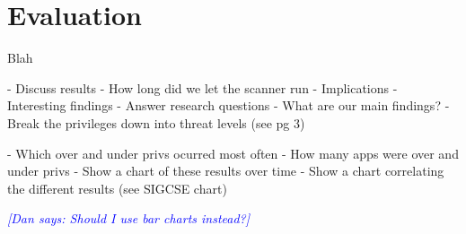 \documentclass{sig-alternate}
\newcommand{\dan}[1]{\textcolor{blue}{{\it [Dan says: #1]}}}
\begin{document}
\label{sec: evaluation}
\section{Evaluation}

Blah


- Discuss results
- How long did we let the scanner run
- Implications
- Interesting findings
- Answer research questions
- What are our main findings?
- Break the privileges down into threat levels (see pg 3)\cite{Felt:2011:EAP:2002168.2002175}


- Which over and under privs ocurred most often
- How many apps were over and under privs
- Show a chart of these results over time
- Show a chart correlating the different results (see SIGCSE chart)


\dan{Should I use bar charts instead?}

\end{document}
